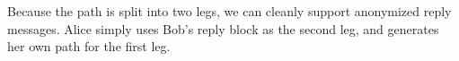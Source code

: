 \documentclass{llncs}
\begin{document}
%
%

Because the path is split into two legs, we can cleanly support anonymized
reply messages. Alice simply uses Bob's reply block as the second leg,
and generates her own path for the first leg.
\end{document}
